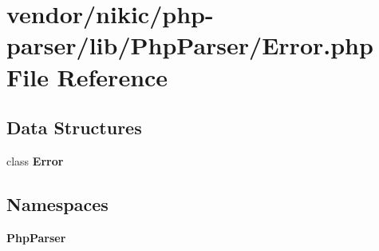 \section{vendor/nikic/php-\/parser/lib/\+Php\+Parser/\+Error.php File Reference}
\label{nikic_2php-parser_2lib_2_php_parser_2_error_8php}
\subsection*{Data Structures}
\begin{DoxyCompactItemize}
\item 
class {\bf Error}
\end{DoxyCompactItemize}
\subsection*{Namespaces}
\begin{DoxyCompactItemize}
\item 
 {\bf Php\+Parser}
\end{DoxyCompactItemize}
